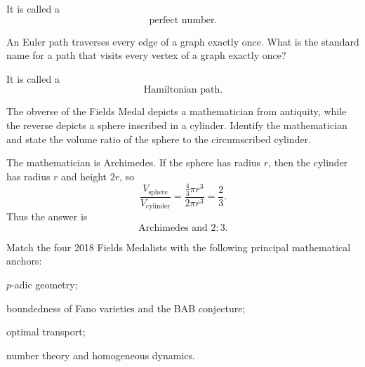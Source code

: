    \begin{solution}
        It is called a
        \[
            \boxed{\text{perfect number}}.
        \]
    \end{solution}

    \begin{expectedproblem}
        An Euler path traverses every edge of a graph exactly once. What is the
        standard name for a path that visits every vertex of a graph exactly
        once?
    \end{expectedproblem}

    \begin{solution}
        It is called a
        \[
            \boxed{\text{Hamiltonian path}}.
        \]
    \end{solution}

    \begin{expectedproblem}
        The obverse of the Fields Medal depicts a mathematician from antiquity,
        while the reverse depicts a sphere inscribed in a cylinder. Identify the
        mathematician and state the volume ratio of the sphere to the
        circumscribed cylinder.
    \end{expectedproblem}

    \begin{solution}
        The mathematician is Archimedes. If the sphere has radius $r$, then the
        cylinder has radius $r$ and height $2r$, so
        \[
            \frac{V_{\mathrm{sphere}}}{V_{\mathrm{cylinder}}}
            =
            \frac{\frac43\pi r^3}{2\pi r^3}
            =
            \frac23.
        \]
        Thus the answer is
        \[
            \boxed{\text{Archimedes and }2:3}.
        \]
    \end{solution}

    \begin{expectedproblem}
        Match the four 2018 Fields Medalists with the following principal
        mathematical anchors:
        \begin{problemchoices}
            \item $p$-adic geometry;
            \item boundedness of Fano varieties and the BAB conjecture;
            \item optimal transport;
            \item number theory and homogeneous dynamics.
        \end{problemchoices}
    \end{expectedproblem}


